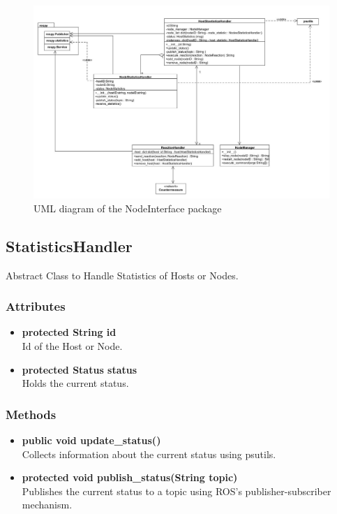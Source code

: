 
\begin{figure}[!ht]
\begin{center}
\includegraphics[width = 1.0 \linewidth]{./diagram_pictures/erfassung.jpg}
\caption{UML diagram of the NodeInterface package}
\end{center}
\end{figure}
\newpage


\subsection{StatisticsHandler}
Abstract Class to Handle Statistics of Hosts or Nodes.


\subsubsection{Attributes}
\begin{itemize}
	\item \textbf{protected String id}\\
	Id of the Host or Node.	
	\item \textbf{protected Status status}\\
	Holds the current status.
\end{itemize}

\subsubsection{Methods}
\begin{itemize}
\item \textbf{public void update\_status()}\\
			Collects information about the current status using psutils.
\item \textbf{protected void publish\_status(String topic)}\\
			Publishes the current status to a topic using ROS's publisher-subscriber mechanism.
\end{itemize}



